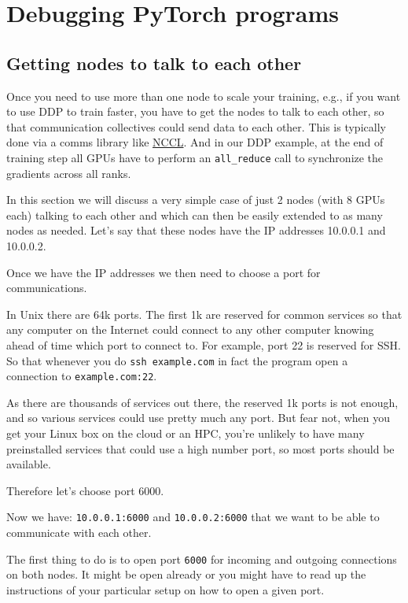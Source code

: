\documentclass[
]{report}
\author{}
\date{2024-02-13}
\begin{document}
\chapter{Debugging PyTorch programs}\label{debugging-pytorch-programs}

\section{Getting nodes to talk to each
other}\label{getting-nodes-to-talk-to-each-other}

Once you need to use more than one node to scale your training, e.g., if
you want to use DDP to train faster, you have to get the nodes to talk
to each other, so that communication collectives could send data to each
other. This is typically done via a comms library like
\href{https://github.com/nVIDIA/nccl}{NCCL}. And in our DDP example, at
the end of training step all GPUs have to perform an
\texttt{all\_reduce} call to synchronize the gradients across all ranks.

In this section we will discuss a very simple case of just 2 nodes (with
8 GPUs each) talking to each other and which can then be easily extended
to as many nodes as needed. Let's say that these nodes have the IP
addresses 10.0.0.1 and 10.0.0.2.

Once we have the IP addresses we then need to choose a port for
communications.

In Unix there are 64k ports. The first 1k are reserved for common
services so that any computer on the Internet could connect to any other
computer knowing ahead of time which port to connect to. For example,
port 22 is reserved for SSH. So that whenever you do
\texttt{ssh\ example.com} in fact the program open a connection to
\texttt{example.com:22}.

As there are thousands of services out there, the reserved 1k ports is
not enough, and so various services could use pretty much any port. But
fear not, when you get your Linux box on the cloud or an HPC, you're
unlikely to have many preinstalled services that could use a high number
port, so most ports should be available.

Therefore let's choose port 6000.

Now we have: \texttt{10.0.0.1:6000} and \texttt{10.0.0.2:6000} that we
want to be able to communicate with each other.

The first thing to do is to open port \texttt{6000} for incoming and
outgoing connections on both nodes. It might be open already or you
might have to read up the instructions of your particular setup on how
to open a given port.
\end{document}
